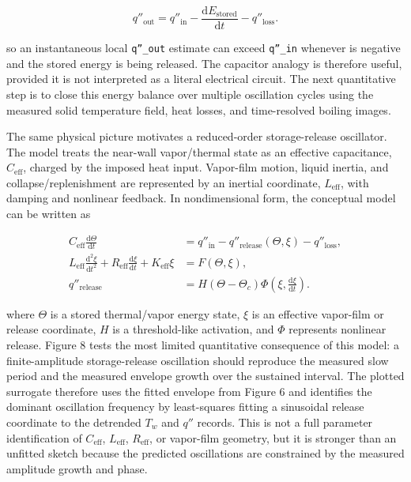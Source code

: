 \documentclass[final,1p,times]{elsarticle}
\begin{document}
\begin{equation}
q''_{\mathrm{out}} = q''_{\mathrm{in}} - \frac{\mathrm{d}E_{\mathrm{stored}}}{\mathrm{d}t} - q''_{\mathrm{loss}} .
\label{eq:energy-balance}
\end{equation}

so an instantaneous local \texttt{q''\_out} estimate can exceed \texttt{q''\_in} whenever  is negative and the stored energy is being released. The capacitor analogy is therefore useful, provided it is not interpreted as a literal electrical circuit. The next quantitative step is to close this energy balance over multiple oscillation cycles using the measured solid temperature field, heat losses, and time-resolved boiling images.

The same physical picture motivates a reduced-order storage-release oscillator. The model treats the near-wall vapor/thermal state as an effective capacitance, $C_{\mathrm{eff}}$, charged by the imposed heat input. Vapor-film motion, liquid inertia, and collapse/replenishment are represented by an inertial coordinate, $L_{\mathrm{eff}}$, with damping and nonlinear feedback. In nondimensional form, the conceptual model can be written as

\begin{equation}
\begin{aligned}
C_{\mathrm{eff}}\frac{\mathrm{d}\Theta}{\mathrm{d}t} &= q''_{\mathrm{in}} - q''_{\mathrm{release}}(\Theta,\xi) - q''_{\mathrm{loss}}, \\
L_{\mathrm{eff}}\frac{\mathrm{d}^2\xi}{\mathrm{d}t^2} + R_{\mathrm{eff}}\frac{\mathrm{d}\xi}{\mathrm{d}t} + K_{\mathrm{eff}}\xi &= F(\Theta,\xi), \\
q''_{\mathrm{release}} &= H(\Theta-\Theta_c)\Phi\left(\xi,\frac{\mathrm{d}\xi}{\mathrm{d}t}\right) .
\end{aligned}
\label{eq:storage-release}
\end{equation}

where $\Theta$ is a stored thermal/vapor energy state, $\xi$ is an effective vapor-film or release coordinate, $H$ is a threshold-like activation, and $\Phi$ represents nonlinear release. Figure 8 tests the most limited quantitative consequence of this model: a finite-amplitude storage-release oscillation should reproduce the measured slow period and the measured envelope growth over the sustained interval. The plotted surrogate therefore uses the fitted envelope from Figure 6 and identifies the dominant oscillation frequency by least-squares fitting a sinusoidal release coordinate to the detrended $T_w$ and $q''$ records. This is not a full parameter identification of $C_{\mathrm{eff}}$, $L_{\mathrm{eff}}$, $R_{\mathrm{eff}}$, or vapor-film geometry, but it is stronger than an unfitted sketch because the predicted oscillations are constrained by the measured amplitude growth and phase.
\end{document}
